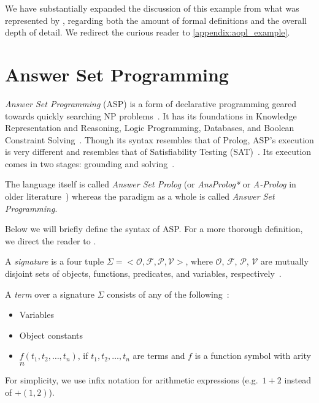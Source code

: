 We have substantially expanded the discussion of this example from what was represented by \citet{gelfond_authorization_2008}, regarding both the amount of formal definitions and the overall depth of detail.
We redirect the curious reader to \cref{appendix:aopl_example}.

\section{Answer Set Programming}
\label{sec:asp}

\textit{Answer Set Programming} (ASP) is a form of declarative programming geared towards quickly searching NP problems~\citep{vladimir_lifschitz_what_2008}.
It has its foundations in Knowledge Representation and Reasoning, Logic Programming, Databases, and Boolean Constraint Solving~\citep{gebser_potassco_2011}.
Though its syntax resembles that of Prolog, ASP's execution is very different and resembles that of Satisfiability Testing (SAT)~\citep{gebser_potassco_2011,vladimir_lifschitz_what_2008}.
Its execution comes in two stages: grounding and solving~\citep{gebser_potassco_2011}.

The language itself is called \textit{Answer Set Prolog} (or \textit{AnsProlog*} or \textit{A-Prolog} in older literature~\citep{baral_answer_2004}) whereas the paradigm as a whole is called \textit{Answer Set Programming}.


Below we will briefly define the syntax of ASP.
For a more thorough definition, we direct the reader to \citet{calimeri_asp-core-2_2020,gebser_abstract_2015}.

\begin{definition}
    A \textit{signature} is a four tuple $\Sigma = <\mathcal{O}, \mathcal{F}, \mathcal{P}, \mathcal{V}>$, where $\mathcal{O}$, $\mathcal{F}$, $\mathcal{P}$, $\mathcal{V}$ are mutually disjoint sets of objects, functions, predicates, and variables, respectively~\citep{blount_architecture_2013}.
\end{definition}

\begin{definition}
    A \textit{term} over a signature $\Sigma$ consists of any of the following~\citep{blount_architecture_2013}:
    \begin{itemize}
        \item Variables
        \item Object constants
        \item $f(t_1, t_2, \dots, t_n)$, if $t_1, t_2, \dots, t_n$ are terms and $f$ is a function symbol with arity $n$
    \end{itemize}
    For simplicity, we use infix notation for arithmetic expressions (e.g.~$1+2$ instead of $+(1, 2)$).
\end{definition}

